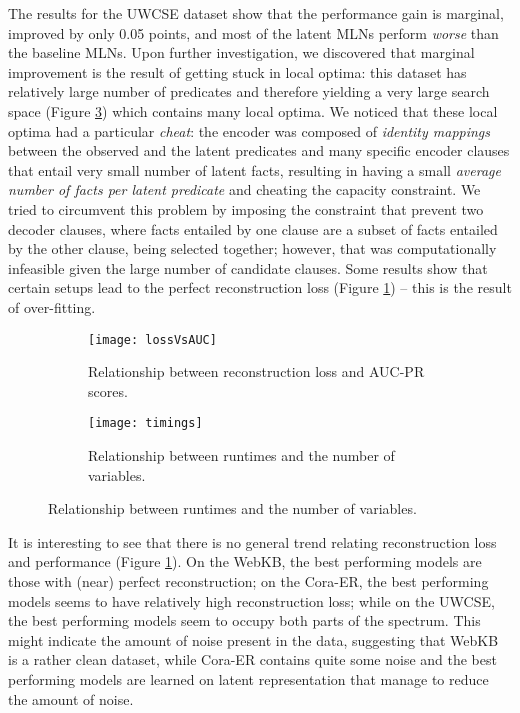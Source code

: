 The results for the UWCSE dataset show that the performance gain is marginal, improved by only 0.05 points, and most of the latent MLNs perform \textit{worse} than the baseline MLNs.
Upon further investigation, we discovered that marginal improvement is the result of  getting stuck in local optima: this dataset has relatively large number of predicates  and therefore yielding a very large search space (Figure \ref{fig:timings}) which contains many local optima.
We noticed that these local optima had a particular \textit{cheat}: the encoder was composed of \textit{identity mappings} between the observed and the latent predicates and many specific encoder clauses that entail very small number of latent facts, resulting in having a small \textit{average number of facts per latent predicate} and cheating the capacity constraint.
We tried to circumvent this problem by imposing the constraint that prevent two decoder clauses, where facts entailed by one clause are a subset of facts entailed by the other clause, being selected together; however, that was computationally infeasible given the large number of candidate clauses.
Some results show that certain setups lead to the perfect reconstruction loss (Figure \ref{fig:lossvsaucpr}) -- this is the result of over-fitting. 




\begin{figure}[t!]
	\centering
	\begin{subfigure}[t]{0.48\linewidth}
		\centering
		\texttt{[image: lossVsAUC]}
		\caption{Relationship between reconstruction loss and AUC-PR scores. \label{fig:lossvsaucpr}}
	\end{subfigure}
	\hspace{.2em}
	\begin{subfigure}[t]{0.48\linewidth}
		\centering
		\texttt{[image: timings]}
		
		\caption{Relationship between runtimes and the number of variables.\label{fig:timings}}
	\end{subfigure}
\end{figure}



It is interesting to see that there is no general trend relating reconstruction loss and performance (Figure \ref{fig:lossvsaucpr}).
On the WebKB, the best performing models are those with (near) perfect reconstruction; on the Cora-ER, the best performing models seems to have relatively high reconstruction loss; while on the UWCSE, the best performing models seem to occupy both parts of the spectrum. 
This might indicate the amount of noise present in the data, suggesting that WebKB is a rather clean dataset, while Cora-ER contains quite some noise and the best performing models are learned on latent representation that manage to reduce the amount of noise.


